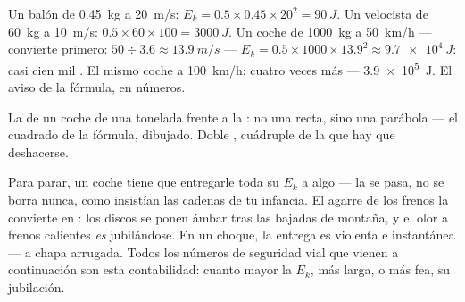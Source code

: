 \begin{example}\label{ex:g9:kinetic-energy-safety:first}
Un balón de \qty{0.45}{kg} a \qty{20}{m/s}: $E_k = 0.5 \times 0.45
\times 20^2 = \qty{90}{J}$. Un velocista de \qty{60}{kg} a
\qty{10}{m/s}: $0.5 \times 60 \times 100 = \qty{3000}{J}$. Un coche de
\qty{1000}{kg} a \qty{50}{km/h} --- convierte primero: $50 \div 3.6
\approx \qty{13.9}{m/s}$ --- $E_k = 0.5 \times 1000 \times 13.9^2
\approx \qty{9.7e4}{J}$: casi cien mil . El mismo coche a
\qty{100}{km/h}: cuatro veces más --- \qty{3.9e5}{J}. El aviso de la
fórmula, en números.
\end{example}

\begin{omfigure}

{\small La  de un coche de una tonelada frente a la
: no una recta, sino una parábola --- el cuadrado de la
fórmula, dibujado. Doble , cuádruple
 de la que hay que deshacerse.}
\end{omfigure}

\begin{example}\label{ex:g9:kinetic-energy-safety:brakes}
Para parar, un coche tiene que entregarle toda su $E_k$ a algo --- la
 se pasa, no se borra nunca, como insistían las cadenas de
tu infancia. El agarre de los frenos la convierte en : los
discos se ponen ámbar tras las bajadas de montaña, y el olor a frenos
calientes \emph{es}  jubilándose. En un choque, la
entrega es violenta e instantánea --- a chapa arrugada. Todos los
números de seguridad vial que vienen a continuación son esta
contabilidad: cuanto mayor la $E_k$, más larga, o más fea, su
jubilación.
\end{example}

